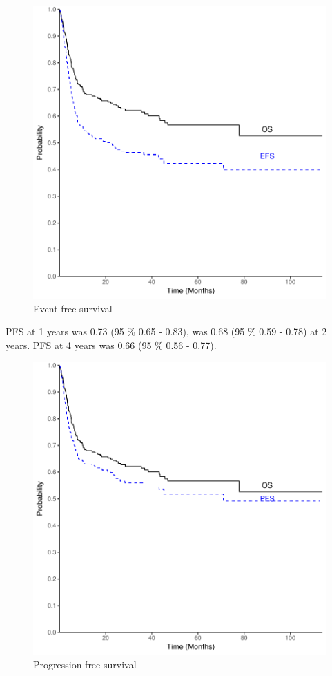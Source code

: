 \documentclass[a4paper,11pt] {article}
\begin{document}
\begin{figure}[h]
\begin{center}
\includegraphics{Rapport-fig2}
\end{center}
\caption{Event-free survival}
\label{fig2}
\end{figure}

\pagebreak
PFS at 1 years was 0.73 (95 \% 0.65 - 0.83), was 0.68 (95 \% 0.59 - 0.78) at 2 years. PFS at 4 years was 0.66 (95 \% 0.56 - 0.77).

\begin{figure}[h]
\begin{center}
\includegraphics{Rapport-fig3}
\end{center}
\caption{Progression-free survival}
\label{fig3}
\end{figure}
\end{document}
